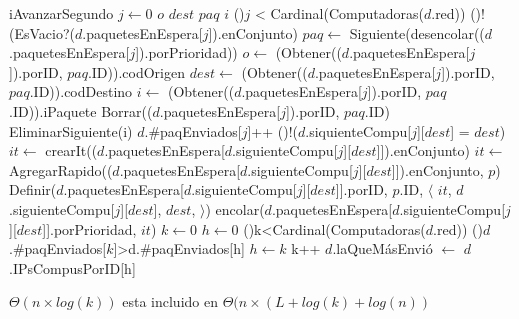\begin{Algoritmos}
  \begin{algoritmo}{iAvanzarSegundo}{}{}
     $j \gets 0$
     $o$
     $dest$
     $paq$
     $i$ 
    \While(){$j$ < Cardinal(Computadoras($d$.red))}{
      \If(){!(EsVacio?($d$.paquetesEnEspera[$j$]).enConjunto)}{
        $paq \gets$ Siguiente(desencolar(($d$.paquetesEnEspera[$j$]).porPrioridad))
        $o \gets$ (Obtener(($d$.paquetesEnEspera[$j$]).porID, $paq$.ID)).codOrigen
        $dest \gets$ (Obtener(($d$.paquetesEnEspera[$j$]).porID, $paq$.ID)).codDestino
        $i \gets$ (Obtener(($d$.paquetesEnEspera[$j$]).porID, $paq$.ID)).iPaquete
        Borrar(($d$.paquetesEnEspera[$j$]).porID, $paq$.ID)
        EliminarSiguiente(i)
        $d$.\#paqEnviados[$j$]++
        \If(){!($d$.siquienteCompu[$j$][$dest$] = $dest$)}{
           $it \gets$ crearIt(($d$.paquetesEnEspera[$d$.siguienteCompu[$j$][$dest$]]).enConjunto)
          $it \gets$ AgregarRapido(($d$.paquetesEnEspera[$d$.siguienteCompu[$j$][$dest$]]).enConjunto, $p$)
          Definir($d$.paquetesEnEspera[$d$.siguienteCompu[$j$][$dest$]].porID, $p$.ID, $\langle$ $it$, $d$.siguienteCompu[$j$][$dest$], $dest$, $\rangle$)
          encolar($d$.paquetesEnEspera[$d$.siguienteCompu[$j$][$dest$]].porPrioridad, $it$)
        }
      }
    }
     $k \gets 0$
     $h \gets 0$
      \While(){k<Cardinal(Computadoras($d$.red))}{
        \If(){$d$.\#paqEnviados[$k$]>d.\#paqEnviados[h]}{
          $h \gets k$
          k++
        }
    }
    $d$.laQueM\'asEnvi\'o $\gets$ $d$.IPsCompusPorID[h]
  \end{algoritmo}
  \datosAlgoritmo{} %
  {} %
  {} %
  {$\Theta(n \times log(k))$ esta incluido en $\Theta(n \times (L+log(k)+log(n))$} %
  {} %



\end{Algoritmos}

